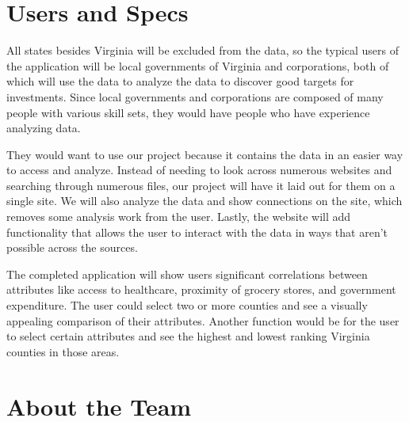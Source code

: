 \documentclass[11pt]{article}
\begin{document}
\section*{Users and Specs}

All states besides Virginia will be excluded from the data, so the typical users of the application will be local governments of Virginia and corporations, both of which will use the data to analyze the data to discover good targets for investments. Since local governments and corporations are composed of many people with various skill sets, they would have people who have experience analyzing data.

They would want to use our project because it contains the data in an easier way to access and analyze. Instead of needing to look across numerous websites and searching through numerous files, our project will have it laid out for them on a single site. We will also analyze the data and show connections on the site, which removes some analysis work from the user. Lastly, the website will add functionality that allows the user to interact with the data in ways that aren't possible across the sources. 


The completed application will show users significant correlations between attributes like access to healthcare, proximity of grocery stores, and government expenditure. The user could select two or more counties and see a visually appealing comparison of their attributes. Another function would be for the user to select certain attributes and see the highest and lowest ranking Virginia counties in those areas.  

\section*{About the Team}
\end{document}
